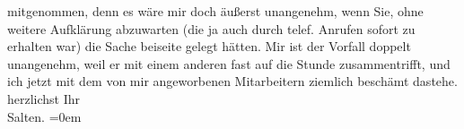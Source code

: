 \begin{ledgroupsized}[t]{13cm}
                  \label{K_L03333-3v}\label{K_L03333-3h} mitgenommen, denn
               es wäre mir doch äußerst unangenehm, wenn Sie, ohne weitere Aufklärung abzuwarten
               (die ja auch durch telef. Anrufen sofort zu erhalten war) die Sache beiseite gelegt
               hätten. Mir ist der Vorfall doppelt unangenehm, weil er mit einem anderen fast auf
               die Stunde zusammentrifft, und ich jetzt mit dem von mir angeworbenen Mitarbeitern
               ziemlich beschämt dastehe.\pend
           \pstart
           herzlichst Ihr {\\[\baselineskip]}\spacefill\mbox{Salten.}\pend
           \leftskip=0em{}
         
         \endnumbering{}\end{ledgroupsized}  \newcommand{\dateiname}{L03333}\newcommand{\titel}{Felix Salten an Arthur Schnitzler, 2. 9. 1902}\newcommand{\editorInnen}{Martin Anton Müller und Laura Untner}
      